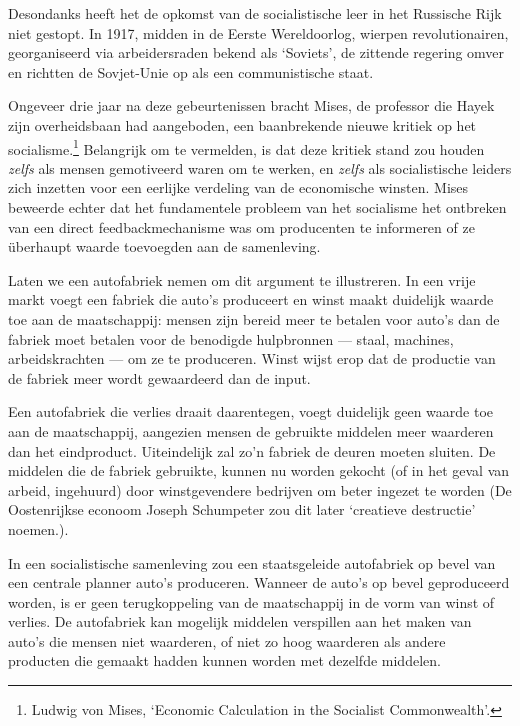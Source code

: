\documentclass[
  a5paper,
  smalldemyvopaper,11pt,twoside,onecolumn,openright,extrafontsizes]{memoir}
\begin{document}
Desondanks heeft het de opkomst van de socialistische leer in het
Russische Rijk niet gestopt. In 1917, midden in de Eerste Wereldoorlog,
wierpen revolutionairen, georganiseerd via arbeidersraden bekend als
`Soviets', de zittende regering omver en richtten de Sovjet-Unie op als
een communistische staat.

Ongeveer drie jaar na deze gebeurtenissen bracht Mises, de professor die
Hayek zijn overheidsbaan had aangeboden, een baanbrekende nieuwe kritiek
op het socialisme.\footnote{\hspace{0pt}Ludwig von Mises, `Economic
  Calculation in the Socialist Commonwealth'.} Belangrijk om te
vermelden, is dat deze kritiek stand zou houden \emph{zelfs} als mensen
gemotiveerd waren om te werken, en \emph{zelfs} als socialistische
leiders zich inzetten voor een eerlijke verdeling van de economische
winsten. Mises beweerde echter dat het fundamentele probleem van het
socialisme het ontbreken van een direct feedbackmechanisme was om
producenten te informeren of ze überhaupt waarde toevoegden aan de
samenleving.

Laten we een autofabriek nemen om dit argument te illustreren. In een
vrije markt voegt een fabriek die auto's produceert en winst maakt
duidelijk waarde toe aan de maatschappij: mensen zijn bereid meer te
betalen voor auto's dan de fabriek moet betalen voor de benodigde
hulpbronnen --- staal, machines, arbeidskrachten --- om ze te
produceren. Winst wijst erop dat de productie van de fabriek meer wordt
gewaardeerd dan de input.

Een autofabriek die verlies draait daarentegen, voegt duidelijk geen
waarde toe aan de maatschappij, aangezien mensen de gebruikte middelen
meer waarderen dan het eindproduct. Uiteindelijk zal zo'n fabriek de
deuren moeten sluiten. De middelen die de fabriek gebruikte, kunnen nu
worden gekocht (of in het geval van arbeid, ingehuurd) door
winstgevendere bedrijven om beter ingezet te worden (De Oostenrijkse
econoom Joseph Schumpeter zou dit later `creatieve destructie' noemen.).

In een socialistische samenleving zou een staatsgeleide autofabriek op
bevel van een centrale planner auto's produceren. Wanneer de auto's op
bevel geproduceerd worden, is er geen terugkoppeling van de maatschappij
in de vorm van winst of verlies. De autofabriek kan mogelijk middelen
verspillen aan het maken van auto's die mensen niet waarderen, of niet
zo hoog waarderen als andere producten die gemaakt hadden kunnen worden
met dezelfde middelen.
\end{document}
